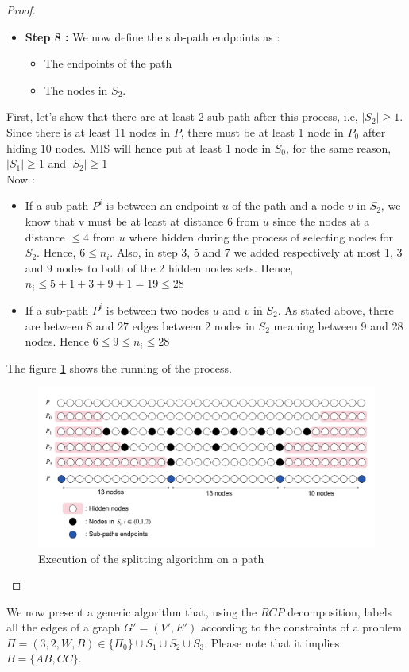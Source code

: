 \begin{claim}
\begin{proof}
\begin{itemize}
\item\textbf{Step 8 :} We now define the sub-path endpoints as : 
\begin{itemize}
    \item The endpoints of the path
    \item The nodes in $S_2$.
\end{itemize}
\end{itemize}
First, let's show that there are at least 2 sub-path after this process, i.e, $|S_2|\geq 1$. Since there is at least 11 nodes in $P$, there must be at least 1 node in $P_0$ after hiding $10$ nodes. MIS will hence put at least 1 node in $S_0$, for the same reason, $|S_1|\geq 1$ and $|S_2|\geq 1$\\
Now :
\begin{itemize}
    \item If a sub-path $P^i$ is between an endpoint $u$ of the path and a node $v$ in $S_2$, we know that v must be at least at distance $6$ from $u$ since the nodes at a distance $\leq 4$ from $u$ where hidden during the process of selecting nodes for $S_2$. Hence, $6\leq n_i$. Also, in step 3, 5 and 7 we added respectively at most 1, 3 and 9 nodes to both of the 2 hidden nodes sets. Hence, $n_i \leq 5+1+3+9+1 = 19 \leq 28$
    \item If a sub-path $P^i$  is between two nodes $u$ and $v$ in $S_2$. As stated above, there are between $8$ and $27$ edges between 2 nodes in $S_2$ meaning between 9 and 28 nodes. Hence $6 \leq 9 \leq n_i \leq 28$

\end{itemize}
The figure \ref{fig:path} shows the running of the process.
\begin{figure}[htb]
    \centering
    \includegraphics[scale = 0.20]{Figures/path.pdf}
    \caption{Execution of the splitting algorithm on a path}
    \label{fig:path}
\end{figure}
\end{proof}
\end{claim}
We now present a generic algorithm that, using the $RCP$ decomposition, labels all the edges of a graph $G'=(V',E')$ according to the constraints of a problem $\Pi=(3,2,W,B) \in \{\Pi_0\}\cup S_1\cup S_2\cup S_3$. Please note that it implies $B=\{AB,CC\}$.

